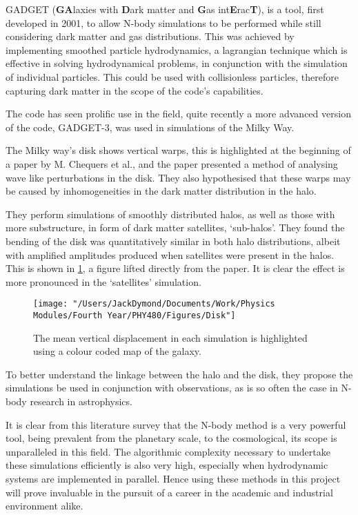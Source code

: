 \documentclass[a4paper,10pt]{article}
\begin{document}
GADGET (\textbf{GA}laxies with \textbf{D}ark matter and \textbf{G}as int\textbf{E}rac\textbf{T}), is a tool, first developed in 2001\cite{Gadget}, to allow N-body simulations to be performed while still considering dark matter and gas distributions. This was achieved by implementing smoothed particle hydrodynamics, a lagrangian technique which is effective in solving hydrodynamical problems, in conjunction with the simulation of individual particles. This could be used with collisionless particles, therefore capturing dark matter in the scope of the code's capabilities. 

The code has seen prolific use in the field, quite recently a more advanced version of the code, GADGET-3, was used in simulations of the Milky Way. 

The Milky way's disk shows vertical warps, this is highlighted at the beginning of a paper by M. Chequers et al.\cite{Bendy}, and the paper presented a method of analysing wave like perturbations in the disk. They also hypothesised that these warps may be caused by inhomogeneities in the dark matter distribution in the halo. 

They perform simulations of smoothly distributed halos, as well as those with more substructure, in form of dark matter satellites, `sub-halos'. They found the bending of the disk was quantitatively similar in both halo distributions, albeit with amplified amplitudes produced when satellites were present in the halos. This is shown in \cref{Disk}, a figure lifted directly from the paper. It is clear the effect is more pronounced in the `satellites' simulation.

\begin{figure}[h!]
\centering
\texttt{[image: "/Users/JackDymond/Documents/Work/Physics Modules/Fourth Year/PHY480/Figures/Disk"]}
\caption{The mean vertical displacement in each simulation is highlighted using a colour coded map of the galaxy.}
\label{Disk}
\end{figure}

To better understand the linkage between the halo and the disk, they propose the simulations be used in conjunction with observations, as is so often the case in N-body research in astrophysics.

It is clear from this literature survey that the N-body method is a very powerful tool, being prevalent from the planetary scale, to the cosmological, its scope is unparalleled in this field. The algorithmic complexity necessary to undertake these simulations efficiently is also very high, especially when hydrodynamic systems are implemented in parallel. Hence using these methods in this project will prove invaluable in the pursuit of a career in the academic and industrial environment alike. 
\end{document}
